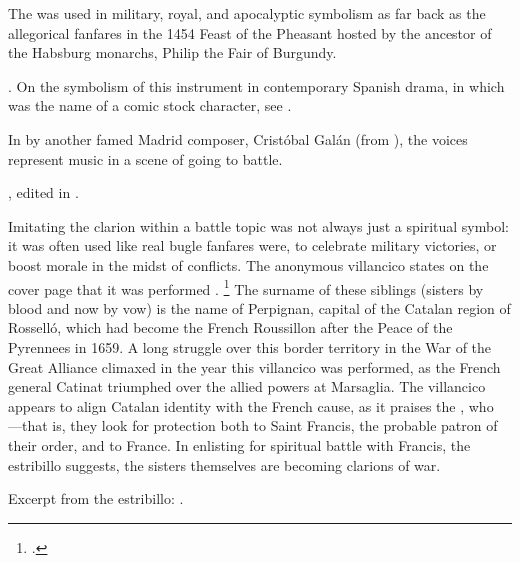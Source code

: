 The  was used in military, royal, and apocalyptic symbolism as far
back as the allegorical  fanfares in the 1454 Feast of the
Pheasant hosted by the ancestor of the Habsburg monarchs, Philip the Fair of
Burgundy.%
\begin{Footnote}
    \Autocites
    [340--380]{LaMarche:Memoires}
    {Bloxam:JNV}
    {Perkins:Patronage15C}.
    On the symbolism of this instrument in contemporary Spanish drama, in which
     was the name of a comic stock character, see
    \autocite{Damjanovic:Clarin}.
\end{Footnote}
In  by another famed Madrid composer, Cristóbal
Galán (from ), the voices represent  music in a scene
of  going to battle.%
\begin{Footnote} 
    , 
    edited in \autocite[555--565]{CaberoPueyo:PhD}.
\end{Footnote}

Imitating the clarion within a battle topic was not always just a spiritual
symbol: it was often used like real bugle fanfares were, to celebrate military
victories, or boost morale in the midst of conflicts.%
    \Autocite[288--294]{Illari:Polychoral}
The anonymous villancico  states on the cover
page that it was performed .%
    \footnote{.}
The surname of these siblings (sisters by blood and now by vow) is the name of
Perpignan, capital of the Catalan region of Rosselló, which had become the
French Roussillon after the Peace of the Pyrennees in 1659.
A long struggle over this border territory in the War of the Great Alliance
climaxed in the year this villancico was performed, as the French general
Catinat triumphed over the allied powers at Marsaglia.
The villancico appears to align Catalan identity with the French cause, as it
praises the , who
---that is,
they look for protection both to Saint Francis, the probable patron of their
order, and to France.
In enlisting for spiritual battle with Francis, the estribillo suggests, the
sisters themselves are becoming clarions of war.%
\begin{Footnote}
    Excerpt from the estribillo: 
    .
\end{Footnote}

